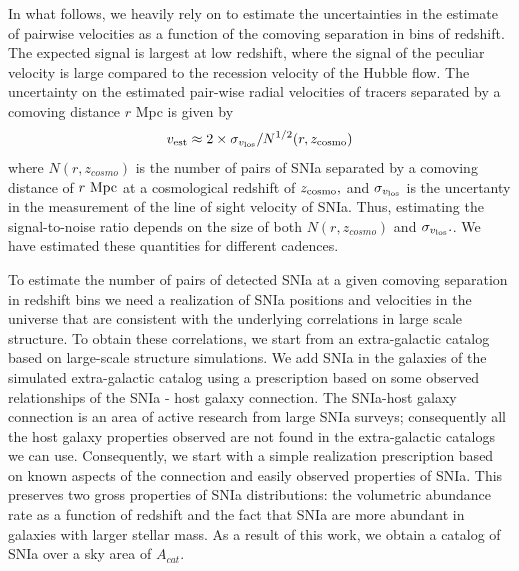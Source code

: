 \documentclass[a4paper,10pt]{article}
\begin{document}
In what follows, we heavily rely on \cite{2011PhRvD..83d3004B} to estimate the uncertainties in the estimate of pairwise velocities as a function of the comoving separation in bins of redshift. The expected signal is largest at low redshift, where the signal of the peculiar velocity is large compared to the recession velocity of the Hubble flow.  The uncertainty on the estimated pair-wise radial velocities of tracers separated by a comoving distance $r$ Mpc is given by
\begin{equation}
v_{\rm{est}} \approx 2 \times \sigma_{v_{\rm{los}}} / N^{1/2}(r, z_{\rm{cosmo}})
\end{equation}
where $N(r,z_{cosmo})$ is the number of pairs of SNIa separated by a comoving distance of $r~\rm{Mpc}$
at a cosmological redshift of $z_{\rm{cosmo}},$ and $\sigma_{v_{\rm{los}}}$ is the uncertanty in the
measurement of the line of sight velocity of SNIa. Thus, estimating the signal-to-noise ratio depends on the size of both $N(r, z_{cosmo})$ and $\sigma_{v_{\rm{los}}}.$. We have estimated these quantities for different cadences. 

To estimate the number of pairs of detected SNIa at a given comoving separation in redshift bins we need a realization of SNIa positions and velocities in the universe that are consistent with the underlying correlations in large scale structure. To obtain these correlations, we start from an extra-galactic catalog based on large-scale structure simulations. We add SNIa in the galaxies of the simulated extra-galactic catalog using a prescription based on some observed relationships of the SNIa - host galaxy connection. The SNIa-host galaxy connection is an area of active research from large SNIa surveys; consequently all the host galaxy properties observed are not found in the extra-galactic catalogs we can use. Consequently, we start with a simple realization prescription based on known aspects of the connection and easily observed properties of SNIa. This preserves two gross properties of SNIa distributions: the volumetric abundance rate as a function of redshift and the fact that SNIa are more abundant in galaxies with larger stellar mass. As a result of this work, we obtain a catalog of SNIa over a sky area of $A_{cat}.$
\end{document}
